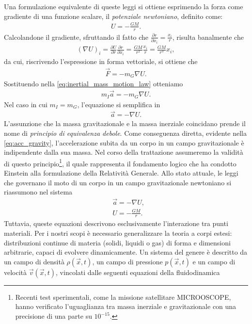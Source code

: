 Una formulazione equivalente di queste leggi si ottiene esprimendo la forza come gradiente di una funzione scalare, il \emph{potenziale newtoniano}, definito come:
\begin{align}
    U = -\frac{GM}{r}.\end{align}
Calcolandone il gradiente, sfruttando il fatto che $\frac{\partial r}{\partial x_i} = \frac{x_i}{r}$, risulta banalmente che
\begin{align}
    (\nabla U)_i = \frac{\partial U}{\partial r} \frac{\partial r}{\partial x_i} = \frac{GM}{r^2} \frac{x_i}{r} = \frac{GM}{r^3} x_i,
\end{align}
da cui, riscrivendo l'espressione in forma vettoriale, si ottiene che
\begin{align}
    \vec{F} = -m_G \nabla U.
\end{align}
Sostituendo nella \eqref{eq:inertial_mass_motion_law} otteniamo
\begin{align}
    m_I \vec{a} = -m_G \nabla U.
\end{align}
Nel caso in cui $m_I = m_G$, l'equazione si semplifica in
\begin{align}
    \label{eq:acc_gravity}\vec{a} = -\nabla U.
\end{align}
L'assunzione che la massa gravitazionale e la massa inerziale coincidano prende il nome di \emph{principio di equivalenza debole}. Come conseguenza diretta, evidente nella \eqref{eq:acc_gravity}, l'accelerazione subita da un corpo in un campo gravitazionale è indipendente dalla sua massa. Nel corso della trattazione assumeremo la validità di questo principio\footnote{Recenti test sperimentali, come la missione satellitare MICROOSCOPE, hanno verificato l'uguaglianza tra massa inerziale e gravitazionale con una precisione di una parte su $10^{-15}$.}, il quale rappresenta il fondamento logico che ha condotto Einstein alla formulazione della Relatività Generale.
Allo stato attuale, le leggi che governano il moto di un corpo in un campo gravitazionale newtoniano si riassumono nel sistema
\begin{align}
    &\vec{a} = -\nabla U, \\
    &U = -\frac{GM}{r}.
\end{align}
Tuttavia, queste equazioni descrivono esclusivamente l'interazione tra punti materiali. Per i nostri scopi è necessario generalizzare la teoria a corpi estesi: distribuzioni continue di materia (solidi, liquidi o gas) di forma e dimensioni arbitrarie, capaci di evolvere dinamicamente. Un sistema del genere è descritto da un campo di densità $\rho(\vec{x}, t)$, un campo di pressione $p(\vec{x}, t)$ e un campo di velocità $\vec{v}(\vec{x}, t)$, vincolati dalle seguenti equazioni della fluidodinamica
